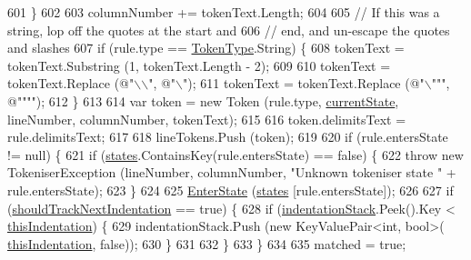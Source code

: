 \begin{DoxyCode}
601                     \}
602 
603                     columnNumber += tokenText.Length;
604 
605                     \textcolor{comment}{// If this was a string, lop off the quotes at the start and}
606                     \textcolor{comment}{// end, and un-escape the quotes and slashes}
607                     \textcolor{keywordflow}{if} (rule.type == \hyperlink{a00045_a301aa7c866593a5b625a8fc158bbeace}{TokenType}.String) \{
608                         tokenText = tokenText.Substring (1, tokenText.Length - 2);
609 
610                         tokenText = tokenText.Replace (\textcolor{stringliteral}{@"\(\backslash\)\(\backslash\)"}, \textcolor{stringliteral}{@"\(\backslash\)"});
611                         tokenText = tokenText.Replace (\textcolor{stringliteral}{@"\(\backslash\)"""}, \textcolor{stringliteral}{@""""});
612                     \}
613 
614                     var token = \textcolor{keyword}{new} Token (rule.type, \hyperlink{a00121_ac90b7dce8103425a148f9e8588f14137}{currentState}, lineNumber, columnNumber, 
      tokenText);
615 
616                     token.delimitsText = rule.delimitsText;
617 
618                     lineTokens.Push (token);
619 
620                     \textcolor{keywordflow}{if} (rule.entersState != null) \{
621                         \textcolor{keywordflow}{if} (\hyperlink{a00121_a2c65c0ba90f973e459583badefef216a}{states}.ContainsKey(rule.entersState) == \textcolor{keyword}{false}) \{
622                             \textcolor{keywordflow}{throw} \textcolor{keyword}{new} TokeniserException (lineNumber, columnNumber, \textcolor{stringliteral}{"Unknown tokeniser
       state "} + rule.entersState);
623                         \}
624 
625                         \hyperlink{a00121_ad3ef08f822b310d9864774b057b96995}{EnterState} (\hyperlink{a00121_a2c65c0ba90f973e459583badefef216a}{states} [rule.entersState]);
626 
627                         \textcolor{keywordflow}{if} (\hyperlink{a00121_ac670aac2245cbd4694dfbd5b69313218}{shouldTrackNextIndentation} == \textcolor{keyword}{true}) \{
628                             \textcolor{keywordflow}{if} (\hyperlink{a00121_a6631a1b1a9109258ab18927e7587ff9b}{indentationStack}.Peek().Key < 
      \hyperlink{a00336_a0e59365a4aa5811f6495b92a51e23573}{thisIndentation}) \{
629                                 indentationStack.Push (\textcolor{keyword}{new} KeyValuePair<int, bool>(
      \hyperlink{a00336_a0e59365a4aa5811f6495b92a51e23573}{thisIndentation}, \textcolor{keyword}{false}));
630                             \}
631 
632                         \}
633                     \}
634 
635                     matched = \textcolor{keyword}{true};

\end{DoxyCode}
